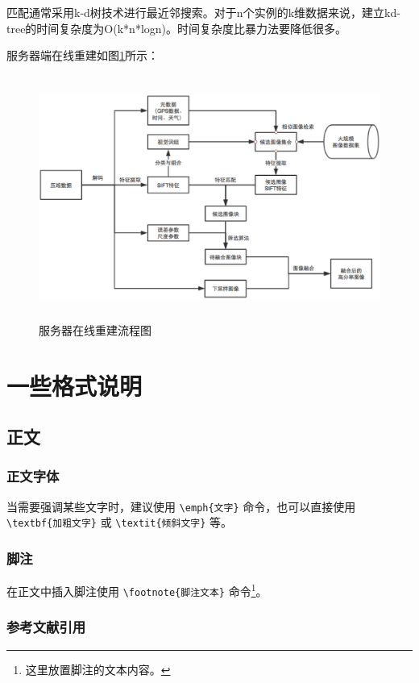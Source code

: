 \documentclass[UTF8]{csoarticle}
\begin{document}
匹配通常采用k-d树\cite{李航2012统计学习方法}技术进行最近邻搜索。对于n个实例的k维数据来说，建立kd-tree的时间复杂度为O(k*n*logn)。时间复杂度比暴力法要降低很多。



服务器端在线重建如图\ref{fig:serverOnline}所示：
\begin{figure}
\centering\includegraphics[height=8cm]{serverOnline}
\caption{服务器在线重建流程图}
\label{fig:serverOnline}
\end{figure}


\section{一些格式说明}

\subsection{正文}

\subsubsection{正文字体}

当需要强调某些文字时，建议使用 \verb|\emph{文字}| 命令，也可以直接使用 \verb|\textbf{加粗文字}| 或 \verb|\textit{倾斜文字}| 等。

\subsubsection{脚注}

在正文中插入脚注使用 \verb|\footnote{脚注文本}| 命令\footnote{这里放置脚注的文本内容。}。

\subsubsection{参考文献引用}
\end{document}

